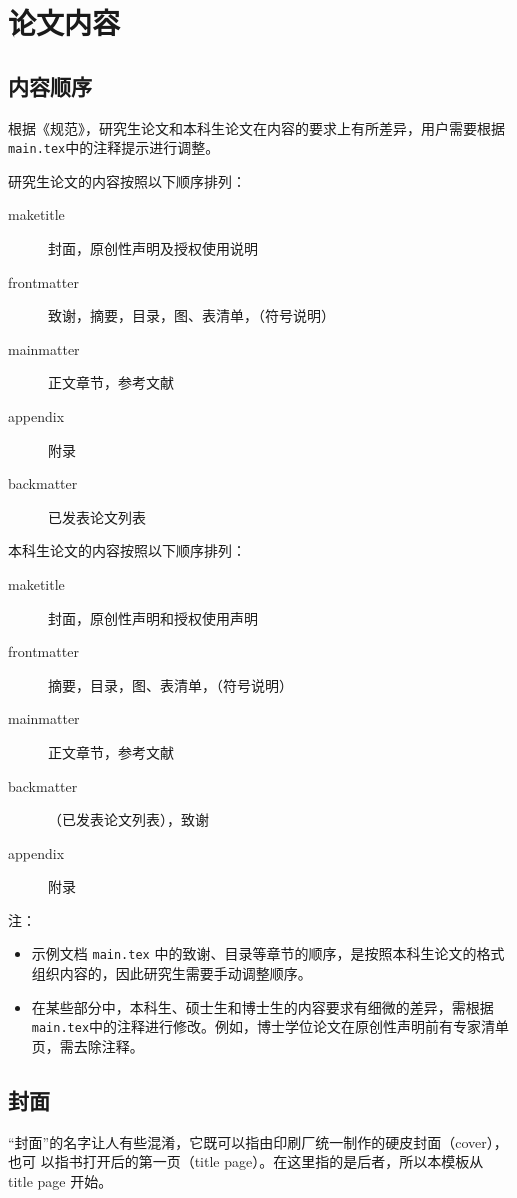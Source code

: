 \documentclass[a4paper]{ltxdoc}
\DeclareRobustCommand\file{\nolinkurl}
\begin{document}
\section{论文内容}
\subsection{内容顺序}
根据《规范》，研究生论文和本科生论文在内容的要求上有所差异，用户需要根据\file{main.tex}中的注释提示进行调整。

研究生论文的内容按照以下顺序排列：

\begin{description}
  \item[maketitle] 封面，原创性声明及授权使用说明
  \item[frontmatter] 致谢，摘要，目录，图、表清单，（符号说明）
  \item[mainmatter] 正文章节，参考文献
  \item[appendix] 附录
  \item[backmatter] 已发表论文列表
\end{description}

本科生论文的内容按照以下顺序排列：

\begin{description}
  \item[maketitle] 封面，原创性声明和授权使用声明
  \item[frontmatter] 摘要，目录，图、表清单，（符号说明）
  \item[mainmatter] 正文章节，参考文献
  \item[backmatter] （已发表论文列表），致谢
  \item[appendix] 附录
\end{description}

注：
\begin{itemize}
  \item  示例文档 \file{main.tex} 中的致谢、目录等章节的顺序，是按照本科生论文的格式组织内容的，因此研究生需要手动调整顺序。
  \item  在某些部分中，本科生、硕士生和博士生的内容要求有细微的差异，需根据\file{main.tex}中的注释进行修改。例如，博士学位论文在原创性声明前有专家清单页，需去除注释。
\end{itemize}
 


\subsection{封面}

“封面”的名字让人有些混淆，它既可以指由印刷厂统一制作的硬皮封面（cover），也可
以指书打开后的第一页（title page）。在这里指的是后者，所以本模板从 title page
开始。
\end{document}
